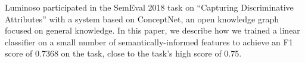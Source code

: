Luminoso participated in the SemEval 2018 task on ``Capturing Discriminative Attributes'' with a system based on ConceptNet, an open knowledge graph focused on general knowledge. In this paper, we describe how we trained a linear classifier on a small number of semantically-informed features to achieve an F1 score of 0.7368 on the task, close to the task's high score of 0.75.
